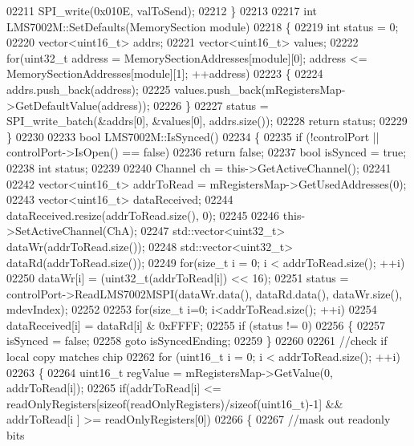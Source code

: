 \begin{DoxyCode}
{{{{{{{{{{{{{{{{{{{{{{{{{{{{{{{{{{{{{{{{{{{{{{{{{{{{{{{{{{{{{{02211     SPI_write(0x010E, valToSend);
02212 \}
02213 
02217 \textcolor{keywordtype}{int} LMS7002M::SetDefaults(MemorySection module)
02218 \{
02219     \textcolor{keywordtype}{int} status = 0;
02220     vector<uint16\_t> addrs;
02221     vector<uint16\_t> values;
02222     \textcolor{keywordflow}{for}(uint32\_t address = MemorySectionAddresses[module][0]; address <= 
      MemorySectionAddresses[module][1]; ++address)
02223     \{
02224         addrs.push\_back(address);
02225         values.push\_back(mRegistersMap->GetDefaultValue(address));
02226     \}
02227     status = SPI_write_batch(&addrs[0], &values[0], addrs.size());
02228     \textcolor{keywordflow}{return} status;
02229 \}
02230 
02233 \textcolor{keywordtype}{bool} LMS7002M::IsSynced()
02234 \{
02235     \textcolor{keywordflow}{if} (!controlPort || controlPort->IsOpen() == \textcolor{keyword}{false})
02236         \textcolor{keywordflow}{return} \textcolor{keyword}{false};
02237     \textcolor{keywordtype}{bool} isSynced = \textcolor{keyword}{true};
02238     \textcolor{keywordtype}{int} status;
02239 
02240     Channel ch = this->GetActiveChannel();
02241 
02242     vector<uint16\_t> addrToRead = mRegistersMap->GetUsedAddresses(0);
02243     vector<uint16\_t> dataReceived;
02244     dataReceived.resize(addrToRead.size(), 0);
02245 
02246     this->SetActiveChannel(ChA);
02247     std::vector<uint32\_t> dataWr(addrToRead.size());
02248     std::vector<uint32\_t> dataRd(addrToRead.size());
02249     \textcolor{keywordflow}{for}(\textcolor{keywordtype}{size\_t} i = 0; i < addrToRead.size(); ++i)
02250         dataWr[i] = (uint32\_t(addrToRead[i]) << 16);
02251     status = controlPort->ReadLMS7002MSPI(dataWr.data(),  dataRd.data(), dataWr.size(),
      mdevIndex);
02252 
02253     \textcolor{keywordflow}{for}(\textcolor{keywordtype}{size\_t} i=0; i<addrToRead.size(); ++i)
02254         dataReceived[i] = dataRd[i] & 0xFFFF;
02255     \textcolor{keywordflow}{if} (status != 0)
02256     \{
02257         isSynced = \textcolor{keyword}{false};
02258         \textcolor{keywordflow}{goto} isSyncedEnding;
02259     \}
02260 
02261     \textcolor{comment}{//check if local copy matches chip}
02262     \textcolor{keywordflow}{for} (uint16\_t i = 0; i < addrToRead.size(); ++i)
02263     \{
02264         uint16\_t regValue = mRegistersMap->GetValue(0, addrToRead[i]);
02265         \textcolor{keywordflow}{if}(addrToRead[i] <= readOnlyRegisters[\textcolor{keyword}{sizeof}(readOnlyRegisters)/\textcolor{keyword}{sizeof}(uint16\_t)-1] && addrToRead[i
      ] >= readOnlyRegisters[0])
02266         \{
02267             \textcolor{comment}{//mask out readonly bits}
}}}}}}}}}}}}}}}}}}}}}}}}}}}}}}}}}}}}}}}}}}}}}}}}}}}}}}}}}}}}}}
\end{DoxyCode}
